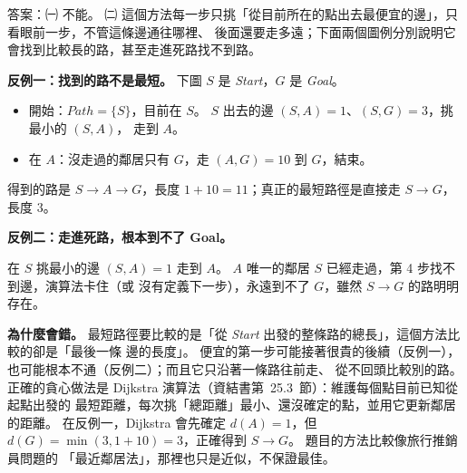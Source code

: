 \begin{pastsoln}
答案：㈠ 不能。 ㈡ 這個方法每一步只挑「從目前所在的點出去最便宜的邊」，只看眼前一步，不管這條邊通往哪裡、
後面還要走多遠；下面兩個圖例分別說明它會找到比較長的路，甚至走進死路找不到路。

\textbf{反例一：找到的路不是最短。} 下圖 $S$ 是 \textit{Start}，$G$ 是 \textit{Goal}。
\begin{center}
\end{center}
\begin{itemize}
\item 開始：$\mathit{Path} = \{S\}$，目前在 $S$。 $S$ 出去的邊 $(S, A) = 1$、$(S, G) = 3$，挑最小的 $(S, A)$，
走到 $A$。
\item 在 $A$：沒走過的鄰居只有 $G$，走 $(A, G) = 10$ 到 $G$，結束。
\end{itemize}
得到的路是 $S \to A \to G$，長度 $1 + 10 = 11$；真正的最短路徑是直接走 $S \to G$，長度 $3$。

\textbf{反例二：走進死路，根本到不了 Goal。}
\begin{center}
\end{center}
在 $S$ 挑最小的邊 $(S, A) = 1$ 走到 $A$。 $A$ 唯一的鄰居 $S$ 已經走過，第 4 步找不到邊，演算法卡住（或
沒有定義下一步），永遠到不了 $G$，雖然 $S \to G$ 的路明明存在。

\textbf{為什麼會錯。} 最短路徑要比較的是「從 \textit{Start} 出發的整條路的總長」，這個方法比較的卻是「最後一條
邊的長度」。 便宜的第一步可能接著很貴的後續（反例一），也可能根本不通（反例二）；而且它只沿著一條路往前走、
從不回頭比較別的路。 正確的貪心做法是 Dijkstra 演算法（資結書第~25.3~節）：維護每個點目前已知從起點出發的
最短距離，每次挑「總距離」最小、還沒確定的點，並用它更新鄰居的距離。 在反例一，Dijkstra 會先確定
$d(A) = 1$，但 $d(G) = \min(3, 1 + 10) = 3$，正確得到 $S \to G$。 題目的方法比較像旅行推銷員問題的
「最近鄰居法」，那裡也只是近似，不保證最佳。
\end{pastsoln}
